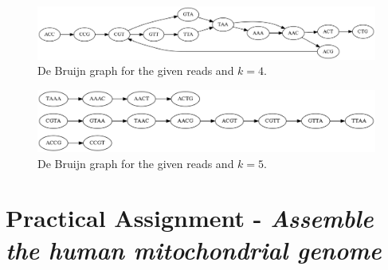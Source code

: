 \documentclass[%
   10pt,              %
   ngerman,           %
   a4paper,           %
   DIV11,             %
]{scrartcl}%
\begin{document}
\begin{figure}[h]
 \centering
 \includegraphics[width=1\textwidth]{deBruijnGraph_4mere.png}
 \caption{De Bruijn graph for the given reads and $k = 4$.}
 \label{fig:4mere}
\end{figure}

\begin{figure}[h]
 \centering
 \includegraphics[width=1\textwidth]{deBruijnGraph_5mere.png}
 \caption{De Bruijn graph for the given reads and $k = 5$.}
 \label{fig:5mere}
\end{figure}

\section*{Practical Assignment - \textit{Assemble the human mitochondrial genome}}
\end{document}
